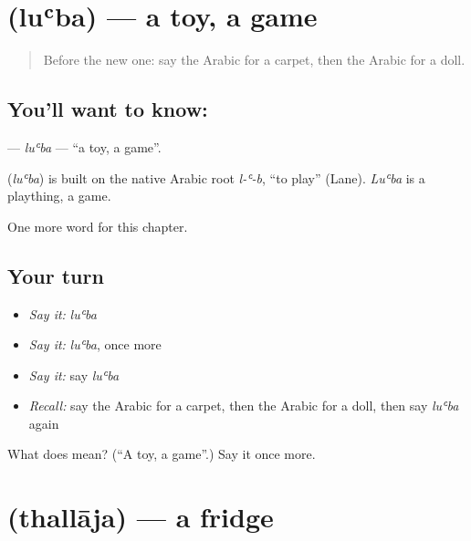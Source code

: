 \section[\texorpdfstring{\ar{لعبة} (luʿba)}{لعبة (luʿba)}]{ (luʿba) — a toy, a game}

\label{lesson:AR-C126-luba}



\begin{quote}
Before the new one: say the Arabic for a carpet, then the Arabic for a doll.
\end{quote}

\subsection*{You'll want to know: }
\textbf{} — \emph{luʿba} — \textquotedblleft{}a toy, a game\textquotedblright{}.

\begin{cousinweb}
\textbf{} (\emph{luʿba}) is built on the native Arabic root \emph{l-ʿ-b}, \textquotedblleft{}to play\textquotedblright{} (Lane). \emph{Luʿba} is a plaything, a game.
\end{cousinweb}

\begin{grammarlens}[title={What you've built}]
One more word for this chapter.
\end{grammarlens}

\subsection*{Your turn}
\begin{itemize}
\raggedright
  \item \emph{Say it:} \emph{luʿba}
  \item \emph{Say it:} \emph{luʿba}, once more
  \item \emph{Say it:} say \emph{luʿba}
  \item \emph{Recall:} say the Arabic for a carpet, then the Arabic for a doll, then say \emph{luʿba} again
\end{itemize}

\begin{tcolorbox}[breakable,colback=teal!4,colframe=teal!35!black,title={Before you move on}]
What does  mean? (\textquotedblleft{}A toy, a game\textquotedblright{}.) Say it once more.
\end{tcolorbox}
\section[\texorpdfstring{\ar{ثلاجة} (thallāja)}{ثلاجة (thallāja)}]{ (thallāja) — a fridge}

